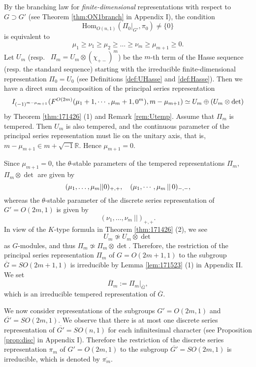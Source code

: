 By the branching law 
 for {\it{finite-dimensional}} representations
 with respect to $G \supset G'$
 (see Theorem \ref{thm:ON1branch} in Appendix I), 
 the condition 
 \[\mbox{Hom}_{O(n,1)}(\Pi_{0}|_{G'},\pi_{0}) \not = \{0\}\]
is equivalent to 
\begin{equation}
\label{eqn:munuGP}
   \mu_1 \geq \nu_1 \geq \mu_2 \geq \dots \geq \nu_{m} \geq \mu_{m+1} \geq 0.  
\end{equation}
Let $U_m$ (resp.~ $\Pi_m=U_m \otimes (\chi_{+-})^m$)
 be the $m$-th term of the Hasse sequence 
 (resp. the standard sequence)
 starting with the irreducible finite-dimensional representation
 $\Pi_0 =U_0$
 (see Definitions \ref{def:UHasse} and \ref{def:Hasse}).  
Then we have a direct sum decomposition 
 of the principal series representation
\[
   I_{(-1)^{m-\mu_{m+1}}}(F^{{O(2m)}}({\mu_1+1, \cdots,\mu_m+1,0^m}), m-\mu_{m+1})
 \simeq U_m \oplus (U_m \otimes \det)
\]
by Theorem \ref{thm:171426} (1) and Remark \ref{rem:Utemp}.  
Assume that $\Pi_m$ is tempered.  
Then $U_m$ is also tempered,
 and the continuous parameter of the principal series representation
 must lie on the unitary axis, 
 that is, 
 $m-\mu_{m+1} \in m + \sqrt{-1}{\mathbb{R}}$.  
Hence $\mu_{m+1}=0$.  



Since $\mu_{m+1}=0$, 
the $\theta$-stable parameters of the tempered representations
 $\Pi_m$, $\Pi_m \otimes \det$ are given by 
\[ 
   (\mu_1,\dots, \mu_m || 0  )_{+,+}, 
\quad
   ({\mu_1, \cdots,\mu_m}\,||\,{0})_{-,-}, 
\]
 whereas the $\theta$-stable parameter 
 of the discrete series representation
 of $G'=O(2m,1)$ is given by 
\[
     (\nu_1, \dots , \nu_m ~|| )_{+,+}.  
\]
In view of the $K$-type formula in Theorem \ref{thm:171426} (2), 
 we see 
\[
   U_m \not \simeq U_m \otimes \det
\]
 as $G$-modules,
 and thus $\Pi_m \not \simeq \Pi_m \otimes \det$.  
Therefore,
 the restriction of the principal series representation $\Pi_m$
 of $G=O(2m+1,1)$ to the subgroup $\overline G=SO(2m+1,1)$ is irreducible
 by Lemma \ref{lem:171523} (1) in Appendix II.  
We set 
\[
  \overline \Pi_m := \Pi_m|_{\overline G}, 
\]
 which is an irreducible tempered representation of $\overline G$.  



We now consider representations
 of the subgroups $G'=O(2m,1)$
 and $\overline{G'}=SO(2m,1)$.  
We observe that there is at most one
 discrete series representation of $\overline{G'}=SO(n,1)$
 for each infinitesimal character 
(see Proposition \ref{prop:disc} in Appendix I). 
Therefore the restriction of the discrete series representation $\pi_m$
 of $G'=O(2m,1)$ to the subgroup $\overline{G'}=SO(2m,1)$
 is irreducible,
 which is denoted by $\overline{\pi_m}$.  



